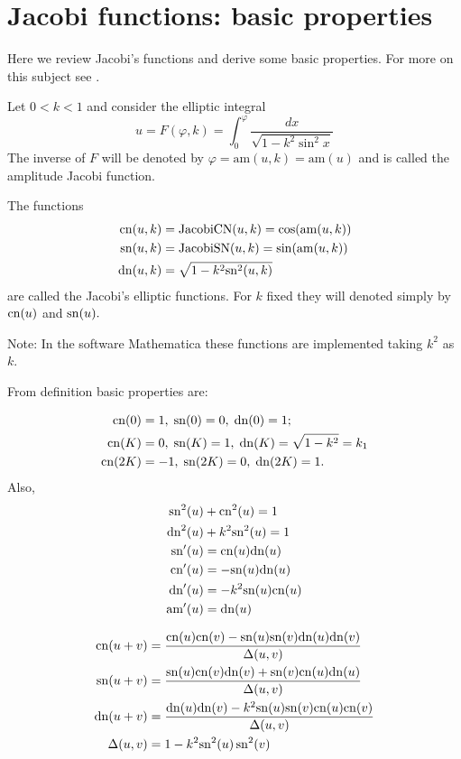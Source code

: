 \section{Jacobi  functions: basic properties}
\label{app:appD-jacobi-functions}

Here we review Jacobi's functions and derive some basic properties. For more on this subject see \cite{armitage-2006}.

Let $0<k<1$ and consider the elliptic integral
\[u=F(\varphi,k)=\int_{0}^{\varphi} \frac {dx}{\sqrt {1-k^2   \sin^2 x  
}} \]
The inverse of $F$ will be denoted by $\varphi=\text{am}(u,k)=\text{am}(u)$ and is called the amplitude Jacobi function.

The functions
\begin{align*}
 \mathrm{cn}(u,k)&=\mathrm{JacobiCN}(u,k)=\cos(\mathrm{am}(u,k))\\ \;
 \mathrm{sn}(u,k)&=\mathrm{JacobiSN}(u,k)=\sin(\mathrm{am}(u,k))\\
 \mathrm{dn}(u,k)&=\sqrt{1-k^2\mathrm{sn}^2(u,k)}
 \end{align*}
\noindent  are called the Jacobi's elliptic  functions. 
For $k$ fixed they will denoted simply by $\mathrm{cn}(u)$ and $\mathrm{sn}(u).$


\noindent Note: In the software Mathematica these functions are implemented taking $k^2$ as $k$.


From definition basic properties are:

\begin{align*}
\mathrm{cn}(0)&=1,\; \mathrm{sn}(0)=0, \; \mathrm{dn}(0)=1;\\
\mathrm{cn}(K)&=0,\; \mathrm{sn}(K)=1, \; \mathrm{dn}(K)=\sqrt{1-k^2}=k_1\\
\mathrm{cn}(2K)&=-1,\; \mathrm{sn}(2K)=0, \; \mathrm{dn}(2K)=1.
\end{align*}
Also,
\begin{align*}
 \mathrm{sn}^2(u)  &+\mathrm{cn}^2(u) =1\\
 \mathrm{dn}^2 (u)&+k^2\mathrm{sn}^2(u)  =1\\
\mathrm{sn}'(u)&=\mathrm{cn}(u)\mathrm{dn}(u)\\
\mathrm{cn}'(u)&=-\mathrm{sn}(u)\mathrm{dn}(u)\\
\mathrm{dn}'(u)&=-k^2\mathrm{sn}(u)\mathrm{cn}(u)\\
\text{am}'(u)&=\mathrm{dn}(u)
\end{align*}

\begin{align*}
    \mathrm{cn}(u+v)&=\frac{\mathrm{cn}(u)\mathrm{cn}(v)-\mathrm{sn}(u)\mathrm{sn}(v)\mathrm{dn}(u)\mathrm{dn}(v)}{\Delta(u,v)}\\
    \mathrm{sn}(u+v)&=\frac{\mathrm{sn}(u)\mathrm{cn}(v)\mathrm{dn}(v)+\mathrm{sn}(v)\mathrm{cn}(u)\mathrm{dn}(u) }{\Delta(u,v)}\\
    \mathrm{dn}(u+v)&=\frac{\mathrm{dn}(u)\mathrm{dn}(v)-k^2\mathrm{sn}(u)\mathrm{sn}(v)\mathrm{cn}(u)\mathrm{cn}(v) }{\Delta(u,v)}\\
    \Delta(u,v)&=1-k^2\mathrm{sn}^2(u)\,\mathrm{sn}^2(v)
\end{align*}

